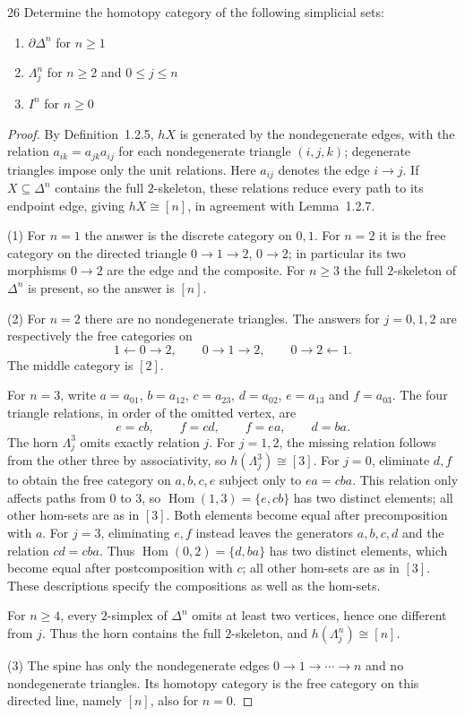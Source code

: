 \begin{exercise}{26}
Determine the homotopy category of the following simplicial sets:
\begin{enumerate}[label=(\arabic*),leftmargin=*,itemsep=0pt,parsep=0pt,
                  topsep=.5\baselineskip]
 \item $\partial\Delta^n$ for $n\ge1$
 \item $\Lambda_j^n$ for $n\ge2$ and $0\le j\le n$
 \item $I^n$ for $n\ge0$
\end{enumerate}

\begin{proof}
By Definition~1.2.5, $hX$ is generated by the nondegenerate edges,
with the relation $a_{ik}=a_{jk}a_{ij}$ for each nondegenerate
triangle $(i,j,k)$; degenerate triangles impose only the unit
relations. Here $a_{ij}$ denotes the edge $i\to j$.
If $X\subseteq\Delta^n$ contains the full $2$-skeleton, these
relations reduce every path to its endpoint edge, giving
$hX\cong[n]$, in agreement with Lemma~1.2.7.

(1) For $n=1$ the answer is the discrete category on $0,1$.
For $n=2$ it is the free category on the directed triangle
$0\to1\to2$, $0\to2$; in particular its two morphisms $0\to2$
are the edge and the composite. For $n\ge3$ the full
$2$-skeleton of $\Delta^n$ is present, so the answer is $[n]$.

(2) For $n=2$ there are no nondegenerate triangles. The answers
for $j=0,1,2$ are respectively the free categories on
\[
 1\longleftarrow0\longrightarrow2,
 \qquad 0\longrightarrow1\longrightarrow2,
 \qquad 0\longrightarrow2\longleftarrow1.
\]
The middle category is $[2]$.

For $n=3$, write
$a=a_{01}$, $b=a_{12}$, $c=a_{23}$, $d=a_{02}$,
$e=a_{13}$ and $f=a_{03}$.
The four triangle relations, in order of the omitted vertex, are
\[
 e=cb,\qquad f=cd,\qquad f=ea,\qquad d=ba.
\]
The horn $\Lambda_j^3$ omits exactly relation $j$.
For $j=1,2$, the missing relation follows from the other three
by associativity, so $h(\Lambda_j^3)\cong[3]$.
For $j=0$, eliminate $d,f$ to obtain the free category on
$a,b,c,e$ subject only to $ea=cba$.
This relation only affects paths from $0$ to $3$, so
$\operatorname{Hom}(1,3)=\{e,cb\}$ has two distinct elements;
all other hom-sets are as in $[3]$. Both elements become equal
after precomposition with $a$.
For $j=3$, eliminating $e,f$ instead leaves the generators
$a,b,c,d$ and the relation $cd=cba$.
Thus $\operatorname{Hom}(0,2)=\{d,ba\}$ has two distinct
elements, which become equal after postcomposition with $c$;
all other hom-sets are as in $[3]$. These descriptions specify
the compositions as well as the hom-sets.

For $n\ge4$, every $2$-simplex of $\Delta^n$ omits at least
two vertices, hence one different from $j$. Thus the horn
contains the full $2$-skeleton, and $h(\Lambda_j^n)\cong[n]$.

(3) The spine has only the nondegenerate edges
$0\to1\to\cdots\to n$ and no nondegenerate triangles.
Its homotopy category is the free category on this directed
line, namely $[n]$, also for $n=0$.
\end{proof}
\end{exercise}
